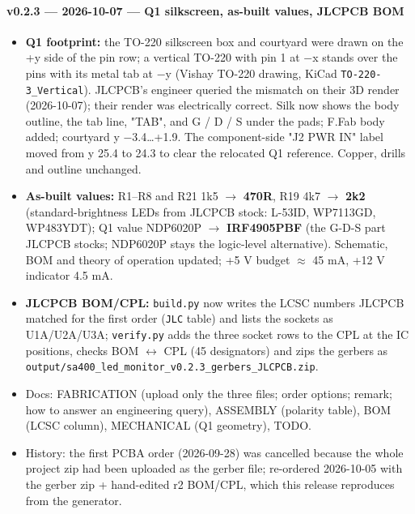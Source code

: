 \documentclass[11pt,a4paper]{article}
\begin{document}
\paragraph{v0.2.3 — 2026-10-07 — Q1 silkscreen, as-built values, JLCPCB BOM}
\begin{itemize}[leftmargin=8mm]
\item \textbf{Q1 footprint:} the TO-220 silkscreen box and courtyard were drawn on the +y side of the pin row; a vertical TO-220 with pin 1 at −x stands over the pins with its metal tab at −y (Vishay TO-220 drawing, KiCad \texttt{TO-220-3\_Vertical}). JLCPCB's engineer queried the mismatch on their 3D render (2026-10-07); their render was electrically correct. Silk now shows the body outline, the tab line, "TAB", and G / D / S under the pads; F.Fab body added; courtyard y −3.4…+1.9. The component-side "J2 PWR IN" label moved from y 25.4 to 24.3 to clear the relocated Q1 reference. Copper, drills and outline unchanged.
\item \textbf{As-built values:} R1–R8 and R21 1k5 $\to$ \textbf{470R}, R19 4k7 $\to$ \textbf{2k2} (standard-brightness LEDs from JLCPCB stock: L-53ID, WP7113GD, WP483YDT); Q1 value NDP6020P $\to$ \textbf{IRF4905PBF} (the G-D-S part JLCPCB stocks; NDP6020P stays the logic-level alternative). Schematic, BOM and theory of operation updated; +5 V budget $\approx$ 45 mA, +12 V indicator 4.5 mA.
\item \textbf{JLCPCB BOM/CPL:} \texttt{build.py} now writes the LCSC numbers JLCPCB matched for the first order (\texttt{JLC} table) and lists the sockets as U1A/U2A/U3A; \texttt{verify.py} adds the three socket rows to the CPL at the IC positions, checks BOM $\leftrightarrow$ CPL (45 designators) and zips the gerbers as \texttt{output/sa400\_led\_monitor\_v0.2.3\_gerbers\_JLCPCB.zip}.
\item Docs: FABRICATION (upload only the three files; order options; remark; how to answer an engineering query), ASSEMBLY (polarity table), BOM (LCSC column), MECHANICAL (Q1 geometry), TODO.
\item History: the first PCBA order (2026-09-28) was cancelled because the whole project zip had been uploaded as the gerber file; re-ordered 2026-10-05 with the gerber zip + hand-edited r2 BOM/CPL, which this release reproduces from the generator.
\end{itemize}
\end{document}

